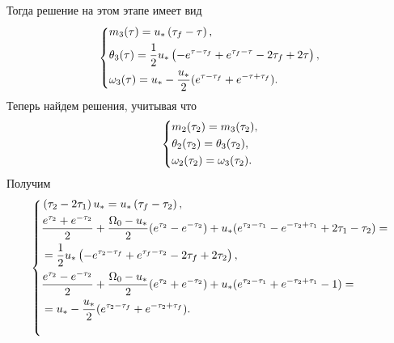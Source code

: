 \documentclass[a4paper,14pt]{article}
\theoremstyle{plain} %
\theoremstyle{definition} %
\theoremstyle{remark} %
\begin{document}
{\[\]
Тогда решение на этом этапе имеет вид
\[
    \left\{ {\begin{aligned}
                 & m_3(\tau) = u_* \left(\tau _f-\tau \right), \hfill                                           \\
                 & \theta_3(\tau) = \frac{1}{2} u_* \left(-e^{\tau -\tau _f}+e^{\tau _f-\tau }-2 \tau _f+2 \tau
                \right), \hfill                                                                                 \\
                 & \omega_3(\tau) =u_*-\frac{u_*}{2}(e^{\tau-\tau_f}+e^{-\tau+\tau_f}) . \hfill                 \\
            \end{aligned}} \right.
\]
Теперь найдем решения, учитывая что
\[
    \left\{ {\begin{aligned}
                 & m_2(\tau_2) = m_3(\tau_2), \hfill            \\
                 & \theta_2(\tau_2) =  \theta_3(\tau_2), \hfill \\
                 & \omega_2(\tau_2) = \omega_3(\tau_2) . \hfill \\
            \end{aligned}} \right.
\]
Получим
\[
    \left\{
    \begin{multlined}
        \left(\tau _2-2 \tau _1\right) u_*=u_* \left(\tau _f-\tau _2\right), \\
        \shoveleft{\frac{e^{\tau_2}+e^{-\tau_2}}{2}+\frac{\Omega_0-u_\ast}{2}(e^{\tau_2}-e^{-\tau_2})+u_*(e^{\tau_2-\tau_1}-e^{-\tau_2+\tau_1}+2\tau_1-\tau_2)=} \\
        \shoveleft{=\frac{1}{2} u_* \left(-e^{\tau _2-\tau _f}+e^{\tau _f-\tau _2}-2 \tau _f+2
            \tau _2\right),} \\
        \shoveleft{\frac{e^{\tau_2}-e^{-\tau_2}}{2}+\frac{\Omega_0-u_\ast}{2}(e^{\tau_2}+e^{-\tau_2})+u_*(e^{\tau_2-\tau_1}+e^{-\tau_2+\tau_1}-1)=} \\
        \shoveleft{=u_*-\frac{u_*}{2}(e^{\tau_2-\tau_f}+e^{-\tau_2+\tau_f}).} \\
    \end{multlined}
    \right.
\]

}
\end{document}
